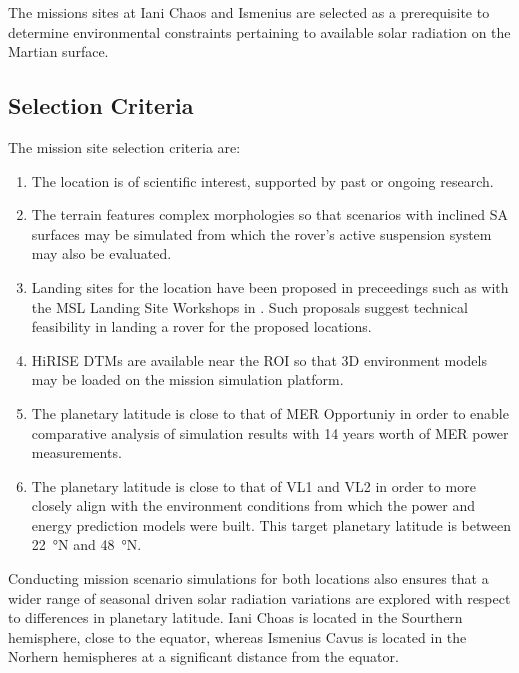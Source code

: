 The missions sites at Iani Chaos and Ismenius are selected as a prerequisite to determine environmental constraints pertaining to available solar radiation on the Martian surface.

\subsection{Selection Criteria}
\label{sec:MissionSites:SelectionCriteria}
The mission site selection criteria are:

\begin{enumerate}[label=\textcolor{BulletBlue}{(\alph*)}]
    \item The location is of scientific interest, supported by past or ongoing research.
    \item The terrain features complex morphologies so that scenarios with inclined \ac{SA} surfaces may be simulated from which the rover's active suspension system may also be evaluated.
    \item Landing sites for the location have been proposed in preceedings such as with the \ac{MSL} Landing Site Workshops in . Such proposals suggest technical feasibility in landing a rover for the proposed locations.
    \item \ac{HiRISE} \acp{DTM} are available near the \ac{ROI} so that 3D environment models may be loaded on the mission simulation platform.
    \item The planetary latitude is close to that of \ac{MER} Opportuniy in order to enable comparative analysis of simulation results with 14 years worth of \ac{MER} power measurements.
    \item The planetary latitude is close to that of \ac{VL1} and \ac{VL2} in order to more closely align with the environment conditions from which the power and energy prediction models were built. This target planetary latitude is between \SI{22}{\degree}N and \SI{48}{\degree}N.
\end{enumerate}

Conducting mission scenario simulations for both locations also ensures that a wider range of seasonal driven solar radiation variations are explored with respect to differences in planetary latitude. Iani Choas is located in the Sourthern hemisphere, close to the equator, whereas Ismenius Cavus is located in the Norhern hemispheres at a significant distance from the equator.

